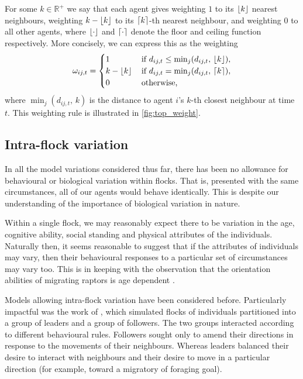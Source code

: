 For some $k\in\mathbb{R}^+$ we say that each agent gives weighting $1$ to its
$\lfloor k\rfloor$ nearest neighbours, weighting $k - \lfloor k\rfloor$ to its $\lceil k\rceil$-th
nearest neighbour, and weighting $0$ to all other agents, where $\lfloor\cdot\rfloor$
and $\lceil\cdot\rceil$ denote the floor and ceiling function respectively. More
concisely, we can express this as the weighting
\begin{equation}
  \label{eq:top_interaction}
  \omega_{ij,t} =
  \begin{cases}
    1           & \, \text{if } d_{ij, t} \leq \min_j(d_{ij,t},\, \lfloor k\rfloor), \\
    k-\lfloor k\rfloor & \, \text{if } d_{ij, t} = \min_j(d_{ij,t},   \, \lceil k\rceil),  \\
    0           & \, \text{otherwise,}
  \end{cases}
\end{equation}
where $\min_j(d_{ij,t},\, k)$ is the distance to agent $i$'s $k$-th closest
neighbour at time $t$. This weighting rule is illustrated in
\cref{fig:top_weight}.

\subsection{Intra-flock variation}

In all the model variations considered thus far, there has been no allowance
for behavioural or biological variation within flocks. That is, presented with
the same circumstances, all of our agents would behave identically. This is
despite our understanding of the importance of biological variation in nature.

Within a single flock, we may reasonably expect there to be variation in the
age, cognitive ability, social standing and physical attributes of the
individuals. Naturally then, it seems reasonable to suggest that if the
attributes of individuals may vary, then their behavioural responses to a
particular set of circumstances may vary too. This is in keeping with the
observation that the orientation abilities of migrating raptors is age
dependent \parencite{thorup03}.

Models allowing intra-flock variation have been considered before. Particularly
impactful was the work of \textcite{couzin05}, which simulated flocks of
individuals partitioned into a group of leaders and a group of followers. The
two groups interacted according to different behavioural rules. Followers
sought only to amend their directions in response to the movements of their
neighbours. Whereas leaders balanced their desire to interact with neighbours
and their desire to move in a particular direction (for example, toward a
migratory of foraging goal).

